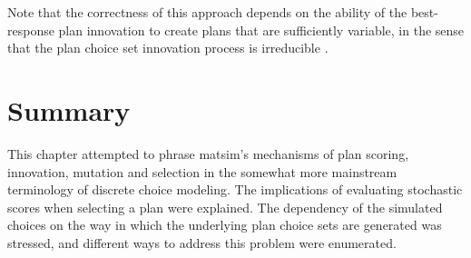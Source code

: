 Note that the correctness of this approach depends on the ability
of the best-response plan innovation to create plans that are sufficiently
variable, 
%
%
in the sense that the plan choice set innovation process
is irreducible \citep[][see also
Section~\ref{sec:Existence-and-uniqueness} for an intuitive definition of
irreducibility]{ross-2006}.

%
%
%
%

%

\section{\label{sec:Summary}Summary}
This chapter attempted to phrase \gls{matsim}'s mechanisms of plan scoring,
innovation, mutation and selection in the somewhat more mainstream
terminology of discrete choice modeling. The implications of evaluating
stochastic scores when selecting a plan were explained. The dependency
of the simulated choices on the way in which the underlying plan choice sets
are generated was stressed, and different ways to address this problem
were enumerated.


